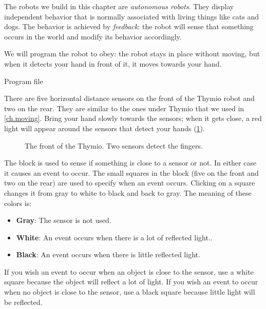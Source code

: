 
\label{ch.pet}

The robots we build in this chapter are \emph{autonomous robots}.
They display independent behavior that is normally associated with
living things like cats and dogs. The behavior is achieved by
\textit{feedback}: the robot will sense that something occurs in the
world and modify its behavior accordingly.


We will program the robot to obey: the robot stays in place without
moving, but when it detects your hand in front of it, it moves towards
your hand.

{\raggedleft \hfill Program file }

There are five horizontal distance sensors on the front of the Thymio
robot and two on the rear. They are similar to the ones under Thymio
that we used in \cref{ch.moving}. Bring your hand slowly towards the
sensors; when it gets close, a red light will appear around the sensors
that detect your hands (\cref{fig.detect}).

\begin{figure}
\begin{center}
\caption{The front of the Thymio. Two sensors detect the fingers.}\label{fig.detect}
\end{center}
\end{figure}

The block  is used to sense if something is close to
a sensor or not. In either case it causes an event to occur. The small
squares in the block (five on the front and two on the rear) are used to specify
when an event occurs. Clicking on a square changes it from gray to white
to black and back to gray. The meaning of these colors is:

\begin{itemize}
\item \textbf{Gray}: The sensor is not used.
\item \textbf{White}: An event occurs when there is a lot of reflected
light.\label{p.proximity-colors2}.
\item \textbf{Black}: An event occurs when there is little reflected
light.
\end{itemize}

If you wish an event to occur when an object is close to the sensor, use
a white square because the object will reflect a lot of light. If you
wish an event to occur when no object is close to the sensor, use a
black square because little light will be reflected.


